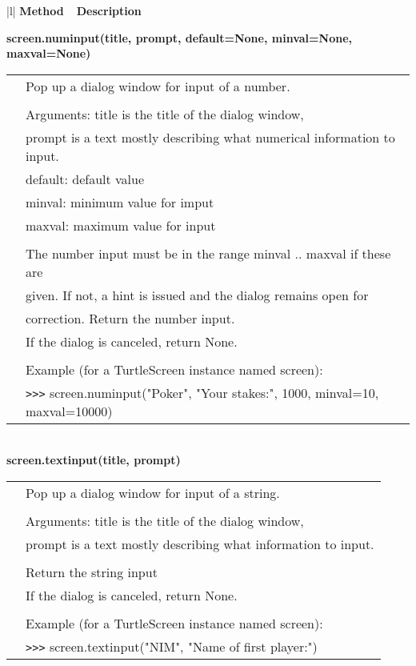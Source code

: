 \begin{center}
{\small
\begin{tabular}{|l|} \hline
{\bf Method~~Description}  \\ \hline\hline 



{\bf    screen.numinput(title, prompt, default=None, minval=None, maxval=None)} \\
   \begin{tabular}{p{0.25in}p{4in}}
&        Pop up a dialog window for input of a number. \\
&  \\
&        Arguments: title is the title of the dialog window, \\
&        prompt is a text mostly describing what numerical information to input. \\
&        default: default value \\
&        minval: minimum value for imput \\
&        maxval: maximum value for input \\
&  \\
&        The number input must be in the range minval .. maxval if these are \\
&        given. If not, a hint is issued and the dialog remains open for \\
&        correction. Return the number input. \\
&        If the dialog is canceled,  return None. \\
&  \\
&        Example (for a TurtleScreen instance named screen): \\
&        \verb+>+\verb+>+\verb+>+ screen.numinput("Poker", "Your stakes:", 1000, minval=10, maxval=10000) \\
\end{tabular} \\ \hline
{\bf    screen.textinput(title, prompt)} \\
   \begin{tabular}{p{0.25in}p{4in}}
&        Pop up a dialog window for input of a string. \\
&  \\
&        Arguments: title is the title of the dialog window, \\
&        prompt is a text mostly describing what information to input. \\
&  \\
&        Return the string input \\
&        If the dialog is canceled, return None. \\
&  \\
&        Example (for a TurtleScreen instance named screen): \\
&        \verb+>+\verb+>+\verb+>+ screen.textinput("NIM", "Name of first player:") \\
\end{tabular} \\ \hline
\end{tabular}}
\end{center}


